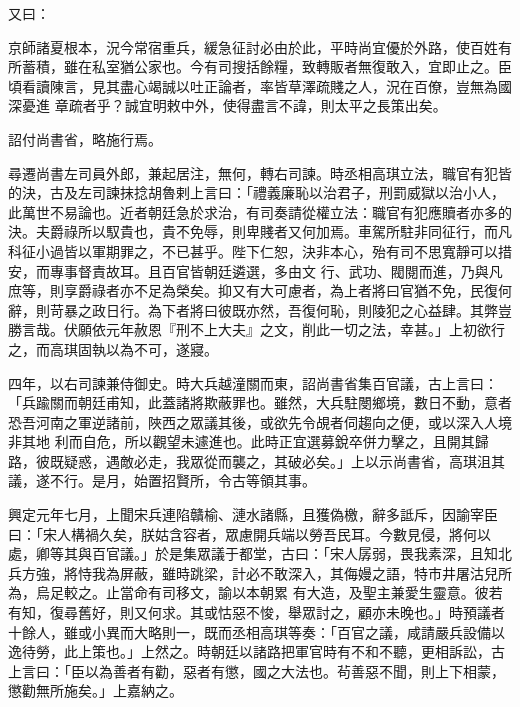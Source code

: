 \begin{pinyinscope}
 又曰：



 京師諸夏根本，況今常宿重兵，緩急征討必由於此，平時尚宜優於外路，使百姓有所蓄積，雖在私室猶公家也。今有司搜括餘糧，致轉販者無復敢入，宜即止之。臣頃看讀陳言，見其盡心竭誠以吐正論者，率皆草澤疏賤之人，況在百僚，豈無為國深憂進
 章疏者乎？誠宜明敕中外，使得盡言不諱，則太平之長策出矣。



 詔付尚書省，略施行焉。



 尋遷尚書左司員外郎，兼起居注，無何，轉右司諫。時丞相高琪立法，職官有犯皆的決，古及左司諫抹捻胡魯剌上言曰：「禮義廉恥以治君子，刑罰威獄以治小人，此萬世不易論也。近者朝廷急於求治，有司奏請從權立法：職官有犯應贖者亦多的決。夫爵祿所以馭貴也，貴不免辱，則卑賤者又何加焉。車駕所駐非同征行，而凡科征小過皆以軍期罪之，不已甚乎。陛下仁恕，決非本心，殆有司不思寬靜可以措安，而專事督責故耳。且百官皆朝廷遴選，多由文
 行、武功、閥閱而進，乃與凡庶等，則享爵祿者亦不足為榮矣。抑又有大可慮者，為上者將曰官猶不免，民復何辭，則苛暴之政日行。為下者將曰彼既亦然，吾復何恥，則陵犯之心益肆。其弊豈勝言哉。伏願依元年赦恩『刑不上大夫』之文，削此一切之法，幸甚。」上初欲行之，而高琪固執以為不可，遂寢。



 四年，以右司諫兼侍御史。時大兵越潼關而東，詔尚書省集百官議，古上言曰：「兵踰關而朝廷甫知，此蓋諸將欺蔽罪也。雖然，大兵駐閿鄉境，數日不動，意者恐吾河南之軍逆諸前，陜西之眾議其後，或欲先令覘者伺趨向之便，或以深入人境非其地
 利而自危，所以觀望未遽進也。此時正宜選募銳卒併力擊之，且開其歸路，彼既疑惑，遇敵必走，我眾從而襲之，其破必矣。」上以示尚書省，高琪沮其議，遂不行。是月，始置招賢所，令古等領其事。



 興定元年七月，上聞宋兵連陷贛榆、漣水諸縣，且獲偽檄，辭多詆斥，因諭宰臣曰：「宋人構禍久矣，朕姑含容者，眾慮開兵端以勞吾民耳。今數見侵，將何以處，卿等其與百官議。」於是集眾議于都堂，古曰：「宋人孱弱，畏我素深，且知北兵方強，將恃我為屏蔽，雖時跳梁，計必不敢深入，其侮嫚之語，特市井屠沽兒所為，烏足較之。止當命有司移文，諭以本朝累
 有大造，及聖主兼愛生靈意。彼若有知，復尋舊好，則又何求。其或怙惡不悛，舉眾討之，顧亦未晚也。」時預議者十餘人，雖或小異而大略則一，既而丞相高琪等奏：「百官之議，咸請嚴兵設備以逸待勞，此上策也。」上然之。時朝廷以諸路把軍官時有不和不聽，更相訴訟，古上言曰：「臣以為善者有勸，惡者有懲，國之大法也。茍善惡不聞，則上下相蒙，懲勸無所施矣。」上嘉納之。




\end{pinyinscope}
